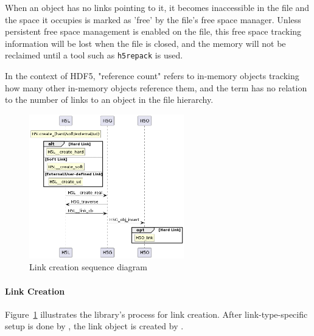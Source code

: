 When an object has no links pointing to it, it becomes inaccessible in the file and the space it occupies is marked as 'free' by the file's free space manager. Unless persistent free space management is enabled on the file, this free space tracking information will be lost when the file is closed, and the memory will not be reclaimed until a tool such as \texttt{h5repack} is used.

In the context of HDF5, "reference count" refers to in-memory objects tracking how many other in-memory objects reference them, and the term has no relation to the number of links to an object in the file hierarchy.

\begin{figure}
    \centering
    \includegraphics[width=0.6\textwidth]{images/tour_4_uml_link_create.png}
    \caption{Link creation sequence diagram}
    \label{fig:tour-4-uml-link-create}
\end{figure}

\paragraph{Link Creation} Figure~\ref{fig:tour-4-uml-link-create} illustrates the library's process for link creation. After link-type-specific setup is done by , the link object is created by .

